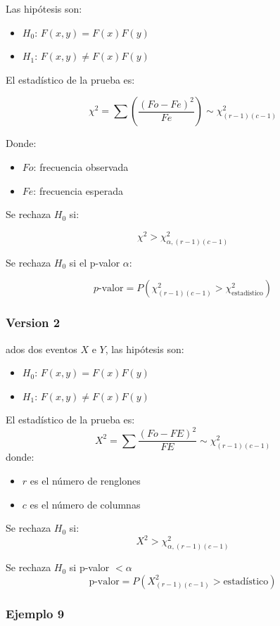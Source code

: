 \documentclass{article}
\begin{document}
Las hipótesis son:

\begin{itemize}
    \item $H_0$: $F(x,y) = F(x)F(y)$
    \item $H_1$: $F(x,y) \neq F(x)F(y)$
\end{itemize}

El estadístico de la prueba es:

\[ \chi^2 = \sum \left( \frac{(Fo - Fe)^2}{Fe} \right) \sim \chi^2_{(r-1)(c-1)} \]

Donde:

\begin{itemize}
    \item $Fo$: frecuencia observada
    \item $Fe$: frecuencia esperada
\end{itemize}

Se rechaza $H_0$ si:

\[ \chi^2 > \chi^2_{\alpha, (r-1)(c-1)} \]

Se rechaza $H_0$ si el p-valor \( \alpha \):

\[ p\text{-valor} = P(\chi^2_{(r-1)(c-1)} > \chi^2_{\text{estadístico}}) \]

\subsubsection*{Version 2}

ados dos eventos $X$ e $Y$, las hipótesis son:
\begin{itemize}
    \item $H_0$: $F(x,y) = F(x)F(y)$
    \item $H_1$: $F(x,y) \neq F(x)F(y)$
\end{itemize}

El estadístico de la prueba es:
\[ X^2 = \sum \frac{(Fo-FE)^2}{FE} \sim \chi^2_{(r-1)(c-1)} \]
donde:
\begin{itemize}
    \item $r$ es el número de renglones
    \item $c$ es el número de columnas
\end{itemize}

Se rechaza $H_0$ si:
\[ X^2 > \chi^2_{\alpha, (r-1)(c-1)} \]

Se rechaza $H_0$ si p-valor \( < \alpha \)
\[ \text{p-valor} = P(X^2_{(r-1)(c-1)} > \text{estadístico}) \]

\subsubsection{Ejemplo 9}
\end{document}
